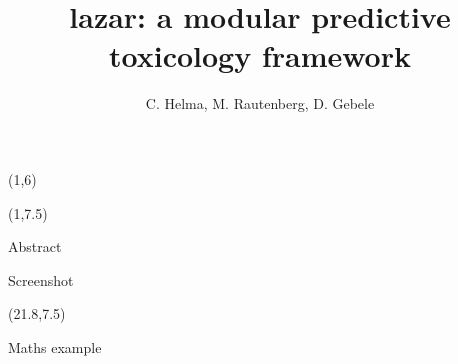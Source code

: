 \documentclass[final]{beamer}
\title{lazar: a modular predictive toxicology framework}
\author{C. Helma, M. Rautenberg, D. Gebele}
\institute{\emph{in silico} toxicology gmbh, Basel, Switzerland}
\begin{document}
    
\begin{frame}{}

\begin{textblock}{40.0}(1,6)

\end{textblock}

 \begin{textblock}{19.5}(1,7.5)
\begin{block}{Abstract}

\end{block}

\begin{block}{Screenshot}

\end{block}
\end{textblock}

\begin{textblock}{19.3}(21.8,7.5)
\begin{block}{Maths example}

\end{block}

\end{textblock}

\end{frame}
\end{document}
